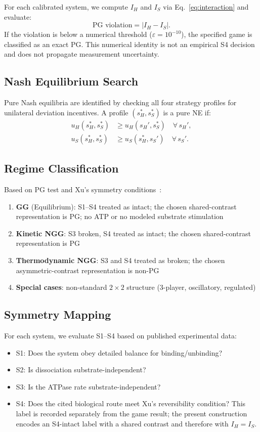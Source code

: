 \documentclass[12pt,a4paper]{article}
\begin{document}
For each calibrated system, we compute $I_H$ and $I_S$ via
Eq.~\eqref{eq:interaction} and evaluate:
\begin{equation}
  \text{PG violation} = |I_H - I_S|.
\end{equation}
If the violation is below a numerical threshold
($\varepsilon = 10^{-10}$), the specified game is classified as an
exact PG. This numerical identity is not an empirical S4 decision and
does not propagate measurement uncertainty.

\subsection{Nash Equilibrium Search}

Pure Nash equilibria are identified by checking all four strategy
profiles for unilateral deviation incentives. A profile $(s_H^*, s_S^*)$
is a pure NE if:
\begin{align}
  u_H(s_H^*, s_S^*) &\geq u_H(s_H', s_S^*) \quad \forall\, s_H', \\
  u_S(s_H^*, s_S^*) &\geq u_S(s_H^*, s_S') \quad \forall\, s_S'.
\end{align}

\subsection{Regime Classification}

Based on PG test and Xu's symmetry conditions~\cite{Xu2022}:
\begin{enumerate}
  \item \textbf{GG} (Equilibrium): S1--S4 treated as intact; the chosen
    shared-contrast representation is PG; no ATP or no modeled
    substrate stimulation
  \item \textbf{Kinetic NGG}: S3 broken, S4 treated as intact; the
    chosen shared-contrast representation is PG
  \item \textbf{Thermodynamic NGG}: S3 and S4 treated as broken; the
    chosen asymmetric-contrast representation is non-PG
  \item \textbf{Special cases}: non-standard $2\times 2$ structure
    (3-player, oscillatory, regulated)
\end{enumerate}

\subsection{Symmetry Mapping}

For each system, we evaluate S1--S4 based on published experimental
data:
\begin{itemize}
  \item S1: Does the system obey detailed balance for binding/unbinding?
  \item S2: Is dissociation substrate-independent?
  \item S3: Is the ATPase rate substrate-independent?
  \item S4: Does the cited biological route meet Xu's reversibility
    condition? This label is recorded separately from the game result;
    the present construction encodes an S4-intact label with a shared
    contrast and therefore with $I_H=I_S$.
\end{itemize}
\end{document}
